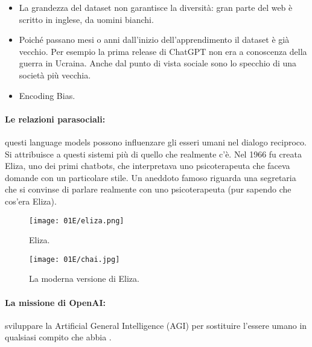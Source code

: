 \begin{itemize}
  \item La grandezza del dataset non garantisce la diversità: gran parte del web è scritto in inglese, da uomini bianchi. 
  \item Poiché passano mesi o anni dall'inizio dell'apprendimento il dataset è già vecchio. Per esempio la prima release di ChatGPT non era a conoscenza della guerra in Ucraina. Anche dal punto di vista sociale sono lo specchio di una società più vecchia.
  \item Encoding Bias.
\end{itemize}
\pagebreak
\paragraph{Le relazioni parasociali:} questi language models possono influenzare gli esseri umani nel dialogo reciproco. Si attribuisce a questi sistemi più di quello che realmente c'è. Nel 1966 fu creata Eliza, uno dei primi chatbots, che interpretava uno psicoterapeuta che faceva domande con un particolare stile. Un aneddoto famoso riguarda una segretaria che si convinse di parlare realmente con uno psicoterapeuta (pur sapendo che cos'era Eliza).

\begin{figure}[h]
    \centering
    \begin{minipage}{0.45\textwidth}
        \centering
        \texttt{[image: 01E/eliza.png]}
        \caption{Eliza.}
    \end{minipage}
    \hfill
    \begin{minipage}{0.45\textwidth}
        \centering
        \texttt{[image: 01E/chai.jpg]}
        \caption{La moderna versione di Eliza.}
    \end{minipage}
\end{figure}


\paragraph{La missione di OpenAI:} sviluppare la Artificial General Intelligence (AGI) per sostituire l'essere umano in qualsiasi compito che abbia .

